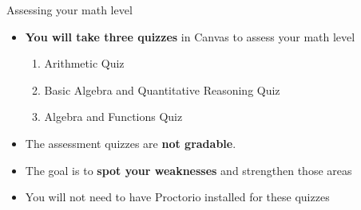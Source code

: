 \documentclass[9pt]{beamer}
\begin{document}
\begin{frame}{Assessing your math level}

        \begin{itemize}[label=$\bullet$]
            \item \textbf{You will take three quizzes} in Canvas to assess your math level
            \begin{enumerate}[label=$+$]
                \item Arithmetic Quiz
                \item Basic Algebra and Quantitative Reasoning Quiz
                \item Algebra and Functions Quiz
            \end{enumerate}
    
            \item The assessment quizzes are \textbf{not gradable}.
            
            \item The goal is to \textbf{spot your weaknesses} and strengthen those areas

            \item You will not need to have Proctorio installed for these quizzes
        \end{itemize}
    
\end{frame}


    
\end{document}
